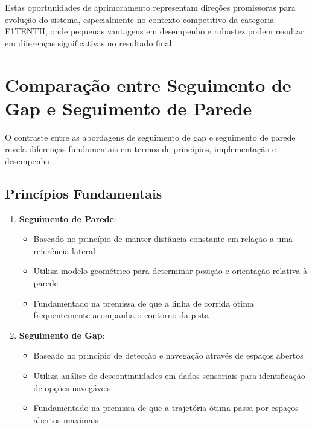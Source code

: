 Estas oportunidades de aprimoramento representam direções promissoras para
evolução do sistema, especialmente no contexto competitivo da categoria
F1TENTH, onde pequenas vantagens em desempenho e robustez podem resultar em
diferenças significativas no resultado final.

\section{Comparação entre Seguimento de Gap e Seguimento de Parede}

O contraste entre as abordagens de seguimento de gap e seguimento de parede
revela diferenças fundamentais em termos de princípios, implementação e
desempenho.

\subsection{Princípios Fundamentais}

\begin{enumerate}
    \item \textbf{Seguimento de Parede}:
          \begin{itemize}
              \item Baseado no princípio de manter distância constante em relação a uma referência
                    lateral
              \item Utiliza modelo geométrico para determinar posição e orientação relativa à
                    parede
              \item Fundamentado na premissa de que a linha de corrida ótima frequentemente
                    acompanha o contorno da pista
          \end{itemize}

    \item \textbf{Seguimento de Gap}:
          \begin{itemize}
              \item Baseado no princípio de detecção e navegação através de espaços abertos
              \item Utiliza análise de descontinuidades em dados sensoriais para identificação de
                    opções navegáveis
              \item Fundamentado na premissa de que a trajetória ótima passa por espaços abertos
                    maximais
          \end{itemize}
\end{enumerate}

